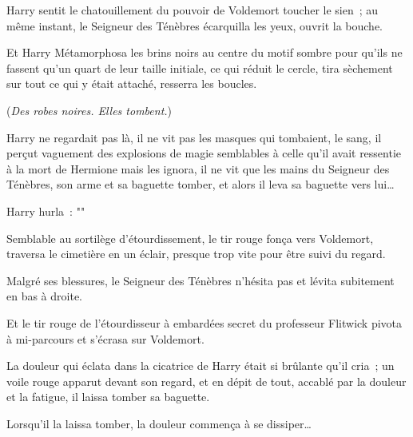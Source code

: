 Harry sentit le chatouillement du pouvoir de Voldemort toucher le sien~; au même instant, le Seigneur des Ténèbres écarquilla les yeux, ouvrit la bouche.

Et Harry Métamorphosa les brins noirs au centre du motif sombre pour qu'ils ne fassent qu'un quart de leur taille initiale, ce qui réduit le cercle, tira sèchement sur tout ce qui y était attaché, resserra les boucles.

(\emph{Des robes noires. Elles tombent.})

Harry ne regardait pas là, il ne vit pas les masques qui tombaient, le sang, il perçut vaguement des explosions de magie semblables à celle qu'il avait ressentie à la mort de Hermione mais les ignora, il ne vit que les mains du Seigneur des Ténèbres, son arme et sa baguette tomber, et alors il leva sa baguette vers lui…

Harry hurla~: ""

Semblable au sortilège d'étourdissement, le tir rouge fonça vers Voldemort, traversa le cimetière en un éclair, presque trop vite pour être suivi du regard.

Malgré ses blessures, le Seigneur des Ténèbres n'hésita pas et lévita subitement en bas à droite.

Et le tir rouge de l'étourdisseur à embardées secret du professeur Flitwick pivota à mi-parcours et s'écrasa sur Voldemort.

La douleur qui éclata dans la cicatrice de Harry était si brûlante qu'il cria~; un voile rouge apparut devant son regard, et en dépit de tout, accablé par la douleur et la fatigue, il laissa tomber sa baguette.

Lorsqu'il la laissa tomber, la douleur commença à se dissiper… 

